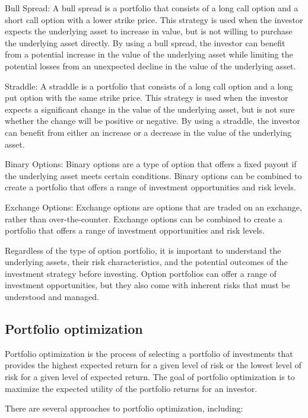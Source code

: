 \documentclass[12pt, a4paper, oneside]{article}
\begin{document}
Bull Spread: A bull spread is a portfolio that consists of a long call option and a short call option with a lower strike price. This strategy is used when the investor expects the underlying asset to increase in value, but is not willing to purchase the underlying asset directly. By using a bull spread, the investor can benefit from a potential increase in the value of the underlying asset while limiting the potential losses from an unexpected decline in the value of the underlying asset.

Straddle: A straddle is a portfolio that consists of a long call option and a long put option with the same strike price. This strategy is used when the investor expects a significant change in the value of the underlying asset, but is not sure whether the change will be positive or negative. By using a straddle, the investor can benefit from either an increase or a decrease in the value of the underlying asset.

Binary Options: Binary options are a type of option that offers a fixed payout if the underlying asset meets certain conditions. Binary options can be combined to create a portfolio that offers a range of investment opportunities and risk levels.

Exchange Options: Exchange options are options that are traded on an exchange, rather than over-the-counter. Exchange options can be combined to create a portfolio that offers a range of investment opportunities and risk levels.

Regardless of the type of option portfolio, it is important to understand the underlying assets, their risk characteristics, and the potential outcomes of the investment strategy before investing. Option portfolios can offer a range of investment opportunities, but they also come with inherent risks that must be understood and managed.




\subsection{ Portfolio optimization }
Portfolio optimization is the process of selecting a portfolio of investments that provides the highest expected return for a given level of risk or the lowest level of risk for a given level of expected return. The goal of portfolio optimization is to maximize the expected utility of the portfolio returns for an investor.

There are several approaches to portfolio optimization, including:
\end{document}
